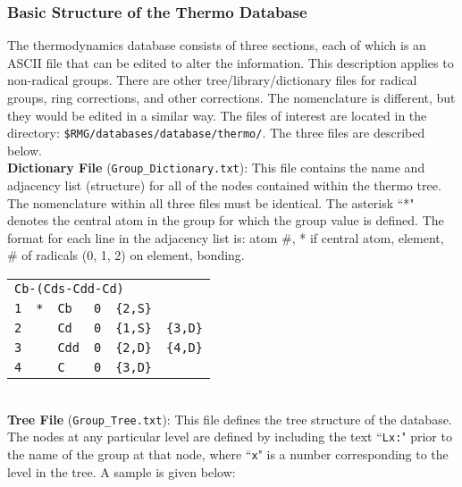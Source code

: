 \documentclass[12pt,letterpaper]{article}
\begin{document}
\subsubsection{Basic Structure of the Thermo Database}

The thermodynamics database consists of three sections, each of which is an ASCII file that can be edited to alter the information. This description
applies to non-radical groups. There are other tree/library/dictionary files
for radical groups, ring corrections, and other corrections. The nomenclature
is different, but they would be edited in a similar way. The files of interest
are located in the directory: \texttt{\$RMG/databases/database/thermo/}.
The three files are described below. \\

\textbf{Dictionary File} (\texttt{Group\_Dictionary.txt}): This file contains the name and
adjacency list (structure) for all of the nodes contained within the thermo
tree. The nomenclature within all three files must be identical. The asterisk
``*" denotes the central atom in the group for which the group value is defined.
The format for each line in the adjacency list is: atom \#, * if central atom,
element, \# of radicals (0, 1, 2) on element, bonding.\\

\begin{tabular}{llllll}
\multicolumn{6}{l}{\texttt{Cb-(Cds-Cdd-Cd)}} \\
\texttt{1} & \texttt{*} & \texttt{Cb}  & \texttt{0} & \texttt{\{2,S\}} &  \\
\texttt{2} &            & \texttt{Cd}  & \texttt{0} & \texttt{\{1,S\}} & \texttt{\{3,D\}} \\
\texttt{3} &            & \texttt{Cdd} & \texttt{0} & \texttt{\{2,D\}} & \texttt{\{4,D\}} \\
\texttt{4} &            & \texttt{C}   & \texttt{0} & \texttt{\{3,D\}} & \\
\end{tabular}\\

\textbf{Tree File} (\texttt{Group\_Tree.txt}): This file defines the tree structure of the
database. The nodes at any particular level are defined by including the text
``\texttt{Lx:}" prior to the name of the group at that node, where ``\texttt{x}" is a number
corresponding to the level in the tree. A sample is given below:\\
\end{document}
